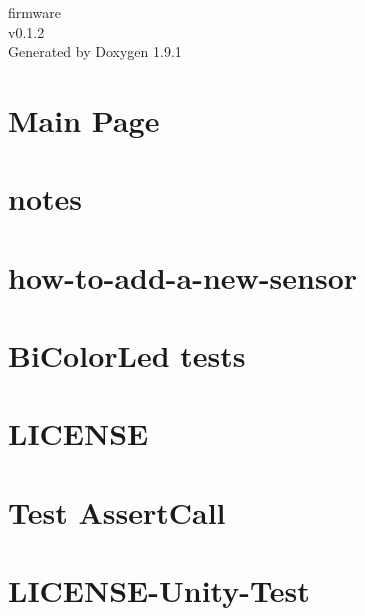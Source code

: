 \let\mypdfximage\pdfximage\def\pdfximage{\immediate\mypdfximage}\documentclass[twoside]{book}
\newcommand{\+}{\discretionary{\mbox{\scriptsize$\hookleftarrow$}}{}{}}
\newcommand{\clearemptydoublepage}{%
  \newpage{\pagestyle{empty}\cleardoublepage}%
}
\begin{document}
\raggedbottom

\hypersetup{pageanchor=false,
             bookmarksnumbered=true,
             pdfencoding=unicode
            }
\begin{titlepage}
\vspace*{7cm}
\begin{center}%
{\Large firmware \\[1ex]\large v0.\+1.\+2 }\\
\vspace*{1cm}
{\large Generated by Doxygen 1.9.1}\\
\end{center}
\end{titlepage}
\clearemptydoublepage
{}
\tableofcontents
\clearemptydoublepage
{}
\hypersetup{pageanchor=true}

\chapter{Main Page}
\label{index}\hypertarget{index}{}
\chapter{notes}
\label{md_cheatsheet}

\chapter{how-\/to-\/add-\/a-\/new-\/sensor}
\label{md_how_to_add_a_new_sensor}

\chapter{Bi\+Color\+Led tests}
\label{md_lib_build_test_runner}

\chapter{LICENSE}
\label{md_LICENSE}

\chapter{Test Assert\+Call}
\label{md_mock_c_build_test_runner}

\chapter{LICENSE-\/\+Unity-\/\+Test}
\label{md_mock_c_LICENSE_Unity_Test}

\end{document}
